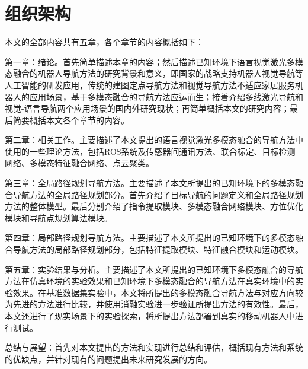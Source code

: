 \section{组织架构}
	本文的全部内容共有五章，各个章节的内容概括如下：

	第一章：绪论。首先简单描述本章的内容；然后描述已知环境下语言视觉激光多模态融合的机器人导航方法的研究背景和意义，即国家的战略支持机器人视觉导航等人工智能的研发应用，传统的建图定点导航方法和视觉导航方法不适应家居服务机器人的应用场景，基于多模态融合的导航方法应运而生；接着介绍多线激光导航和视觉-语言导航两个应用场景的国内外研究现状；再简单概括本文的研究内容；最后简要概括本文各个章节的内容。

	第二章：相关工作。主要描述了本文提出的语言视觉激光多模态融合的导航方法中使用的一些理论方法，包括ROS系统及传感器间通讯方法、联合标定、目标检测网络、多模态特征融合网络、点云聚类。

	第三章：全局路径规划导航方法。主要描述了本文所提出的已知环境下的多模态融合导航方法的全局路径规划部分。首先介绍了目标导航的问题定义和全局路径规划方法的整体模型。最后分别介绍了指令提取模块、多模态融合网络模块、方位优化模块和导航点规划算法模块。

	第四章：局部路径规划导航方法。主要描述了本文所提出的已知环境下的多模态融合导航方法的局部路径规划部分，包括特征提取模块、特征融合模块和运动模块。

	第五章：实验结果与分析。主要描述了本文所提出的已知环境下多模态融合的导航方法在仿真环境的实验效果和已知环境下多模态融合的导航方法在真实环境中的实验效果。在基准数据集实验中，本文将所提出的多模态融合导航方法与对应方向较为先进的方法进行比较，并使用消融实验进一步验证所提出方法的有效性。最后，本文还进行了现实场景下的实验探索，将所提出方法部署到真实的移动机器人中进行测试。

	总结与展望：首先对本文提出的方法和实现进行总结和评估，概括现有方法和系统的优缺点，并针对现有的问题提出未来研究发展的方向。





